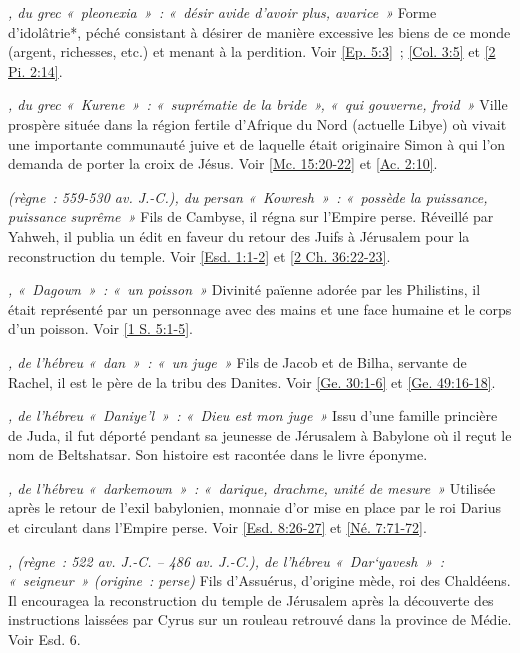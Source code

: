 \begin{multicols}{2}
\textit{, du grec «~pleonexia~»~: «~désir avide d'avoir plus, avarice~»}\newline
Forme d'idolâtrie*, péché consistant à désirer de manière excessive les biens de ce monde (argent, richesses, etc.) et menant à la perdition. Voir \vref{Ep. 5:3}~; \vref{Col. 3:5} et \vref{2 Pi. 2:14}.

\textit{, du grec «~Kurene~»~: «~suprématie de la bride~», «~qui gouverne, froid~»}\newline
Ville prospère située dans la région fertile d'Afrique du Nord (actuelle Libye) où vivait une importante communauté juive et de laquelle était originaire Simon à qui l'on demanda de porter la croix de Jésus. Voir \vref{Mc. 15:20-22} et \vref{Ac. 2:10}.

\textit{(règne~: 559-530 av. J.-C.), du persan «~Kowresh~»~: «~possède la puissance, puissance suprême~»}\newline
Fils de Cambyse, il régna sur l'Empire perse. Réveillé par Yahweh, il publia un édit en faveur du retour des Juifs à Jérusalem pour la reconstruction du temple. Voir \vref{Esd. 1:1-2} et \vref{2 Ch. 36:22-23}.

\textit{, «~Dagown~»~: «~un poisson~»}\newline
Divinité païenne adorée par les Philistins, il était représenté par un personnage avec des mains et une face humaine et le corps d'un poisson. Voir \vref{1 S. 5:1-5}.

\textit{, de l'hébreu «~dan~»~: «~un juge~»}\newline
Fils de Jacob et de Bilha, servante de Rachel, il est le père de la tribu des Danites. Voir \vref{Ge. 30:1-6} et \vref{Ge. 49:16-18}.

\textit{, de l'hébreu «~Daniye'l~»~: «~Dieu est mon juge~»}\newline
Issu d'une famille princière de Juda, il fut déporté pendant sa jeunesse de Jérusalem à Babylone où il reçut le nom de Beltshatsar. Son histoire est racontée dans le livre éponyme.

\textit{, de l'hébreu «~darkemown~»~: «~darique, drachme, unité de mesure~»}\newline
Utilisée après le retour de l'exil babylonien, monnaie d'or mise en place par le roi Darius et circulant dans l'Empire perse. Voir \vref{Esd. 8:26-27} et \vref{Né. 7:71-72}.

\textit{, (règne~: 522 av. J.-C. – 486 av. J.-C.), de l'hébreu «~Dar`yavesh~»~: «~seigneur~» (origine~: perse)}\newline
Fils d'Assuérus, d'origine mède, roi des Chaldéens. Il encouragea la reconstruction du temple de Jérusalem après la découverte des instructions laissées par Cyrus sur un rouleau retrouvé dans la province de Médie. Voir Esd. 6.


\end{multicols}

